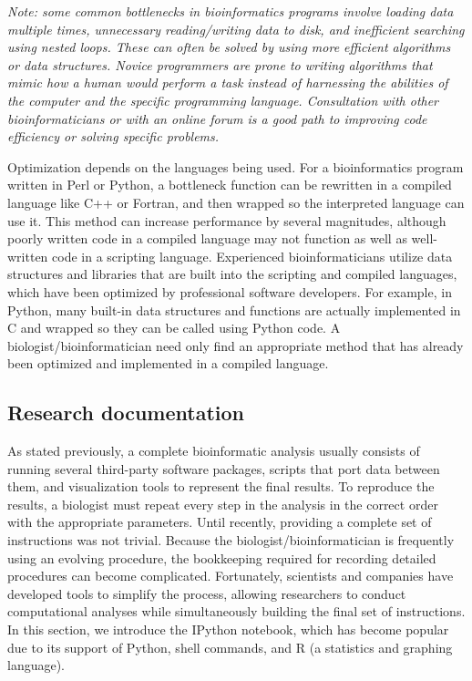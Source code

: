 \documentclass[ChapterTOCs,krantz2]{krantz} %
\begin{document}
\textsl{Note: some common bottlenecks in bioinformatics programs involve 
loading data multiple times, unnecessary reading/writing data to disk, 
and inefficient searching using nested loops.  These can often be solved 
by using more efficient algorithms or data structures.  
Novice programmers are prone to writing algorithms that 
mimic how a human would perform a task instead of 
harnessing the abilities of the computer 
and the specific programming language.  Consultation with other 
bioinformaticians or with an online forum is a good path to improving code efficiency 
or solving specific problems.}

Optimization depends on the
languages being used. For a bioinformatics program written in Perl or Python, a
bottleneck function can be rewritten in a compiled language like C++ or
Fortran, and then wrapped so the interpreted language can use it.  This method can increase performance by several magnitudes,
although poorly written code in a compiled language may not function as well as
well-written code in a scripting language.  Experienced
bioinformaticians utilize data structures and libraries that are
built into the scripting and compiled languages, which have been optimized by
professional software developers.  For example, in Python, many built-in data
structures and functions are actually implemented in C and wrapped so
they can be called using Python code.  A biologist/bioinformatician need only 
find an appropriate method that has already
been optimized and implemented in a compiled language.  

\subsection{Research documentation}

As stated previously, a complete bioinformatic analysis usually
consists of running several third-party software packages, scripts that port
data between them, and visualization tools to represent the final
results.  To reproduce the results, a biologist must
repeat every step in the analysis in the correct order with the appropriate
parameters. Until recently, providing a
complete set of instructions was not trivial.
Because the biologist/bioinformatician is frequently using an evolving
procedure, the bookkeeping required for recording detailed procedures
can become complicated.
Fortunately, scientists and companies have developed tools to simplify
the process, allowing researchers to conduct computational analyses while
simultaneously building the final set of instructions. 
In this section, we introduce the IPython notebook, which has become
popular due to its support of Python, shell commands, and R (a
statistics and graphing language). 
 
\end{document}
